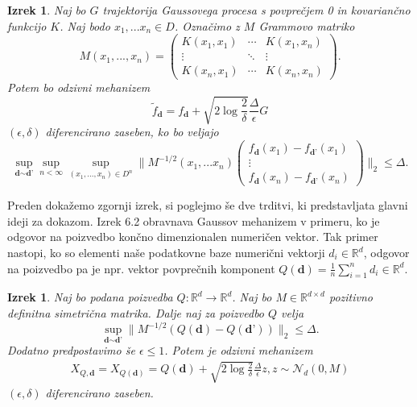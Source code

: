 \documentclass[12pt,a4paper]{amsart}
\theoremstyle{definition} %
\theoremstyle{plain} %
\newtheorem{izrek}[definicija]{Izrek}
\begin{document}
\begin{izrek}
Naj bo $G$ trajektorija Gaussovega procesa s povprečjem 0 in kovariančno funkcijo $K$. Naj bodo $x_1,...x_n \in D$. Označimo z $M$ Grammovo matriko
$$
M(x_1,...,x_n) = 
 \begin{pmatrix}
  K(x_1,x_1) & \cdots & K(x_1,x_n) \\
  \vdots    & \ddots & \vdots  \\
  K(x_n,x_1) & \cdots & K(x_n,x_n) 
 \end{pmatrix}
.$$
Potem bo odzivni mehanizem 
$$
\widetilde{f}_{\textbf{d}} = f_{\textbf{d}} + \sqrt{2\log{\frac{2}{\delta}}} \frac{\Delta}{\epsilon}G
$$
$(\epsilon, \delta)$ diferencirano zaseben, ko bo veljajo
\begin{equation}\label{meja}
\sup_{\textbf{d} \sim \textbf{d'}} \sup_{n < \infty} \sup_{(x_1,...,x_n) \in D^n} 
\bigg\|M^{-1/2}(x_1,...x_n)
\begin{pmatrix}
  f_{\textbf{d}}(x_1)-f_{\textbf{d'}}(x_1)  \\
  \vdots     \\
  f_{\textbf{d}}(x_n)-f_{\textbf{d'}}(x_n)
 \end{pmatrix}
\bigg\|_2 \leq \Delta. \tag{6}
\end{equation}
\end{izrek}
Preden dokažemo zgornji izrek, si poglejmo še dve trditvi, ki predstavljata glavni ideji za dokazom. Izrek 6.2 obravnava Gaussov mehanizem v primeru, ko je odgovor na poizvedbo končno dimenzionalen numeričen vektor. Tak primer nastopi, ko so elementi naše podatkovne baze numerični vektorji $d_i \in \mathbb{R}^d$, odgovor na poizvedbo pa je  npr. vektor povprečnih komponent $Q(\textbf{d}) = \frac{1}{n} \sum_{i=1}^{n} d_i \in \mathbb{R}^d$.
\begin{izrek}
Naj bo podana poizvedba $Q: \mathbb{R}^d \rightarrow \mathbb{R}^d$. Naj bo $M \in \mathbb{R}^{d \times d}$ pozitivno definitna simetrična matrika. Dalje naj za poizvedbo $Q$ velja 
\begin{equation}\label{mejagauss}
\sup_{\textbf{d} \sim \textbf{d'}} \| M^{-1/2}(Q(\textbf{d})-Q(\textbf{d'}))\|_{2} \leq \Delta. \tag{7}
\end{equation}
Dodatno predpostavimo še $\epsilon \leq 1$. Potem je odzivni mehanizem 
\begin{gather*}
X_{Q,\textbf{d}} = X_{Q(\textbf{d})} = Q(\textbf{d}) + \sqrt{2\log{\frac{2}{\delta}}} \frac{\Delta}{\epsilon} z, z \sim \mathcal{N}_d (0,M)
\end{gather*}
$(\epsilon, \delta)$ diferencirano zaseben.
\end{izrek}
\end{document}
